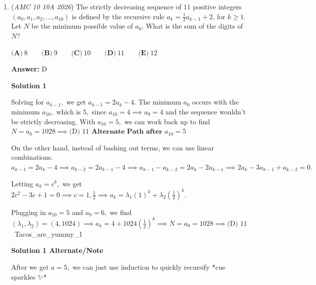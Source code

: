 \begin{enumerate}
\textbf{Solution 6}

Refer to the diagram in Solution 3. Notice that the hexagon is regular, which means that each of its interior angles is $120^{\circ}$. By the Law of Cosines, the blue rectangle's length is $\sqrt{3}$. This means that the overlap between the two squares is $2-\sqrt{3}$, because each square has a side length of $1$. This is the length of the horizontal line across the small rectangle. Reverse engineering the Law of Cosines: $(2+\sqrt{3})^{2} = 2x^{2} - 2x^{2}\cos{120^\circ}$, which after simplifying gives the final answer.
 \[\boxed{\text{(C)\ }18}\]



	\item (\textit{AMC 10 10A 2026}) The strictly decreasing sequence of $11$ positive integers $(a_0,a_1,a_2,\ldots,a_{10})$ is defined by the recursive rule $a_k=\frac{1}{2}a_{k-1}+2$, for $k \geq 1$. Let $N$ be the minimum possible value of $a_0$. What is the sum of the digits of $N$?


 $\textbf{(A)}~8\qquad\textbf{(B)}~9\qquad\textbf{(C)}~10\qquad\textbf{(D)}~11\qquad\textbf{(E)}~12$

 \textbf{Answer: }D



\textbf{Solution 1}

Solving for $a_{k-1},$ we get $a_{k-1}=2a_k-4.$ The minimum $a_0$ occurs with the minimum $a_{10},$ which is $5,$ since $a_{10}=4\implies a_9=4$ and the sequence wouldn't be strictly decreasing. With $a_{10}=5,$ we can work back up to find $N=a_0=1028\implies\boxed{\text{(D) }11}$
$\textbf{Alternate Path after }a_{10}=5$

 On the other hand, instead of bashing out terms, we can use linear combinations. $a_{k-1}=2a_k-4\implies a_{k-2}=2a_{k-1}-4\implies a_{k-1}-a_{k-2}=2a_k-2a_{k-1}\implies 2a_k-3a_{k-1}+a_{k-2}=0.$

 Letting $a_k=c^k,$ we get $2c^2-3c+1=0\implies c=1,\frac{1}{2}\implies a_k=\lambda_1 (1)^k+\lambda_2 \left(\frac{1}{2}\right)^k.$

 Plugging in $a_{10}=5$ and $a_9=6,$ we find $(\lambda_1,\lambda_2)=(4,1024)\implies a_k=4+1024 \left(\frac{1}{2}\right)^k\implies  N=a_{0}=1028\implies\boxed{\text{(D) }11}$~Tacos\_are\_yummy\_1

 


 



\textbf{Solution 1 Alternate/Note}

After we get $a=5,$ we can just use induction to quickly recursify *cue sparkles ✨* 


\end{enumerate}
